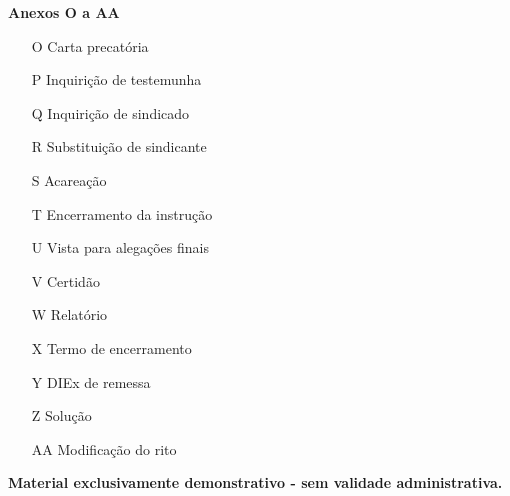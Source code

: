 \documentclass[permitir-placeholders]{sindicancia}
\begin{document}
\begin{minipage}[t]{0.48\textwidth}
\textbf{Anexos O a AA}
\begin{itemize}
  \item[O] Carta precatória
  \item[P] Inquirição de testemunha
  \item[Q] Inquirição de sindicado
  \item[R] Substituição de sindicante
  \item[S] Acareação
  \item[T] Encerramento da instrução
  \item[U] Vista para alegações finais
  \item[V] Certidão
  \item[W] Relatório
  \item[X] Termo de encerramento
  \item[Y] DIEx de remessa
  \item[Z] Solução
  \item[AA] Modificação do rito
\end{itemize}
\end{minipage}

\vfill
\begin{center}
\textbf{Material exclusivamente demonstrativo - sem validade administrativa.}
\end{center}
\clearpage


















\end{document}

